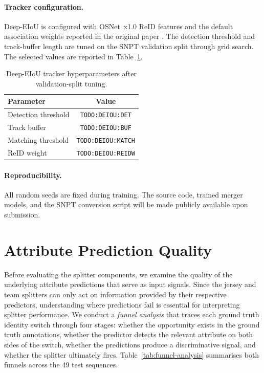\paragraph{Tracker configuration.} Deep-EIoU is configured with OSNet~x1.0 ReID features and the default association weights reported in the original paper \cite{deep-eiou}. The detection threshold and track-buffer length are tuned on the SNPT validation split through grid search. The selected values are reported in Table~\ref{tab:deepeiou_hparams}.

\begin{table}[H]
\centering
\begin{tabular}{lc}
\toprule
\textbf{Parameter} & \textbf{Value} \\
\midrule
Detection threshold      & \texttt{TODO:DEIOU:DET}   \\
Track buffer             & \texttt{TODO:DEIOU:BUF}   \\
Matching threshold       & \texttt{TODO:DEIOU:MATCH} \\
ReID weight              & \texttt{TODO:DEIOU:REIDW} \\
\bottomrule
\end{tabular}
\caption{Deep-EIoU tracker hyperparameters after validation-split tuning.}
\label{tab:deepeiou_hparams}
\end{table}

\paragraph{Reproducibility.} All random seeds are fixed during training. The source code, trained merger models, and the SNPT conversion script will be made publicly available upon submission.


\section{Attribute Prediction Quality}\label{sec:attribute-prediction-quality}

Before evaluating the splitter components, we examine the quality of the underlying attribute predictions that serve as input signals. Since the jersey and team splitters can only act on information provided by their respective predictors, understanding where predictions fail is essential for interpreting splitter performance. We conduct a \emph{funnel analysis} that traces each ground truth identity switch through four stages: whether the opportunity exists in the ground truth annotations, whether the predictor detects the relevant attribute on both sides of the switch, whether the predictions produce a discriminative signal, and whether the splitter ultimately fires. Table~\ref{tab:funnel-analysis} summarises both funnels across the 49 test sequences.

